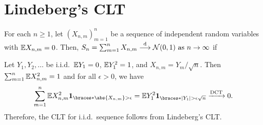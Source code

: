 \documentclass[12pt]{article}
\begin{document}
\section{Lindeberg's CLT}
\begin{Theorem}
For each $n \geq 1$, let $\left(X_{n,m}\right)_{m=1}^n$ be a sequence of independent random variables with $\E X_{n,m} = 0$. Then, $S_n = \sum_{m=1}^n X_{n,m} \convd \calN (0,1) \ \text{as} \ n \to \infty$ if
\end{Theorem}

\begin{Remark}
Let $Y_1,Y_2,\ldots$ be i.i.d.\, $\E Y_1=0$, $\E Y_1^2=1$, and $X_{n,m}=Y_m/\sqrt{n}$. Then $\sum_{m=1}^n \E X_{n,m}^2=1$ and for all $\epsilon>0$, we have
\begin{align*}
\sum_{m=1}^n \E X_{n,m}^2 \indicator{\abs{X_{n,m}} > \epsilon}
= \E Y_1^2\indicator{|Y_1|>\epsilon\sqrt{n}} \xrightarrow{\text{DCT}} 0.
\end{align*}
Therefore, the CLT for i.i.d.\ sequence follows from Lindeberg's CLT.
\end{Remark}
\end{document}
